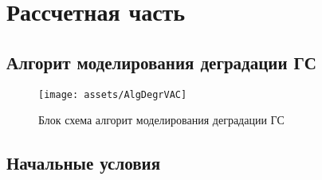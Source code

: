 \chapter{Рассчетная часть}
\section{Алгорит моделирования деградации ГС}
\begin{figure}[h]
  \centering
  \texttt{[image: assets/AlgDegrVAC]}
  \caption{Блок схема алгорит моделирования деградации ГС}
  \label{img:AlgDegrVAC}
\end{figure}
\section{Начальные условия}
